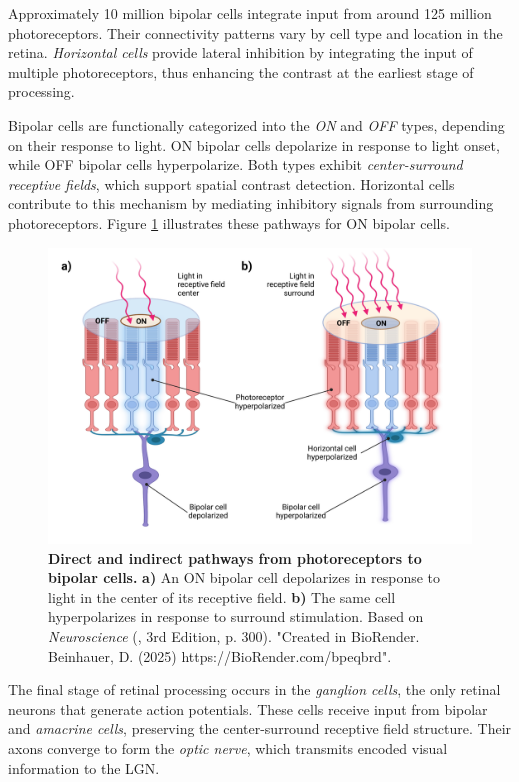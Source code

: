 Approximately 10 million bipolar cells integrate input from around 125 million photoreceptors. Their connectivity patterns vary by cell type and location in the retina. \emph{Horizontal cells} provide lateral inhibition by integrating the input of multiple photoreceptors, thus enhancing the contrast at the earliest stage of processing.

Bipolar cells are functionally categorized into the \emph{ON} and \emph{OFF} types, depending on their response to light. ON bipolar cells depolarize in response to light onset, while OFF bipolar cells hyperpolarize. Both types exhibit \emph{center-surround receptive fields}, which support spatial contrast detection. Horizontal cells contribute to this mechanism by mediating inhibitory signals from surrounding photoreceptors. Figure \ref{fig:on_off_cells} illustrates these pathways for ON bipolar cells.

\begin{figure}
    \centering
    \includegraphics[width=\linewidth]{img/on_off_cells.pdf}
    \caption{\textbf{Direct and indirect pathways from photoreceptors to bipolar cells.} \textbf{a)} An ON bipolar cell depolarizes in response to light in the center of its receptive field. \textbf{b)} The same cell hyperpolarizes in response to surround stimulation. Based on \emph{Neuroscience} (\citet{bear2020neuroscience}, 3rd Edition, p. 300). "Created in BioRender. Beinhauer, D. (2025) https://BioRender.com/bpeqbrd".}
    \label{fig:on_off_cells}
\end{figure}

The final stage of retinal processing occurs in the \emph{ganglion cells}, the only retinal neurons that generate action potentials. These cells receive input from bipolar and \emph{amacrine cells}, preserving the center-surround receptive field structure. Their axons converge to form the \emph{optic nerve}, which transmits encoded visual information to the LGN.

